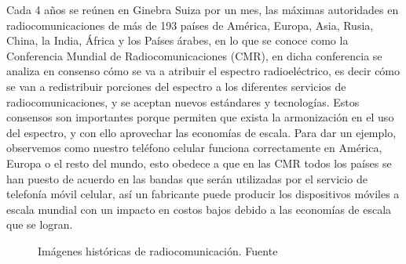 Cada 4 años se reúnen en Ginebra Suiza por un mes, las máximas autoridades en radiocomunicaciones de más de 193 países de América, Europa, Asia, Rusia, China, la India, África y los Países árabes, en lo que se conoce como la Conferencia Mundial de Radiocomunicaciones (CMR), en dicha conferencia se analiza en consenso cómo se va a atribuir el espectro radioeléctrico, es decir cómo se van a redistribuir porciones del espectro a los diferentes servicios de radiocomunicaciones, y se aceptan nuevos estándares y tecnologías. Estos consensos son importantes porque permiten que exista la armonización en el uso del espectro, y con ello aprovechar las economías de escala. Para dar un ejemplo, observemos como nuestro teléfono celular funciona correctamente en América, Europa o el resto del mundo, esto obedece a que en las CMR todos los países se han puesto de acuerdo en las bandas que serán utilizadas por el servicio de telefonía móvil celular, así un fabricante puede producir los dispositivos móviles a escala mundial con un impacto en costos bajos debido a las economías de escala que se logran.


\begin{figure}[!htb]
  \centering
   \hspace{3mm}

  \caption{Im\'agenes hist\'oricas de radiocomunicaci\'on. Fuente \protect\cite{historia_radiofrecuencias}}
  \label{fig:09.imagenes.historicas.radiocomunicacion}
\end{figure}


